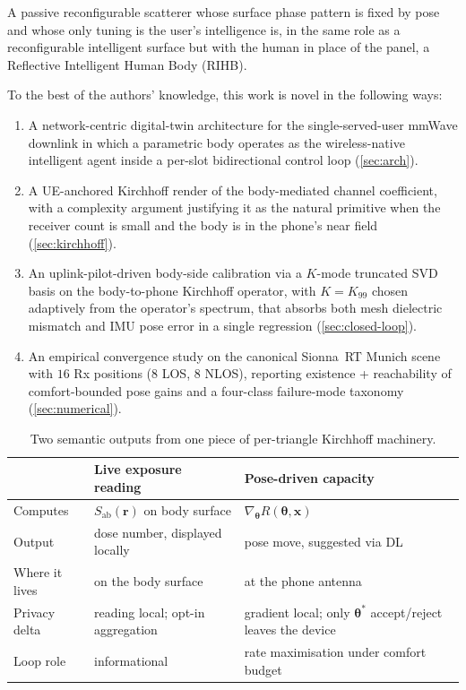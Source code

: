 \documentclass[journal,twocolumn,10pt]{IEEEtran}
\theoremstyle{plain}
\theoremstyle{definition}
\theoremstyle{remark}
\newcommand{\rr}{\mathbf{r}}
\newcommand{\xx}{\mathbf{x}}
\newcommand{\Sab}{S_{\mathrm{ab}}}
\newcommand{\thetab}{\bm{\theta}}
\begin{document}
A passive reconfigurable scatterer whose surface phase pattern is
fixed by pose and whose only tuning is the user's intelligence is,
in the same role as a reconfigurable intelligent surface but with
the human in place of the panel, a Reflective Intelligent Human
Body (RIHB).

To the best of the authors' knowledge, this work is novel in the
following ways:
\begin{enumerate}
\item A network-centric digital-twin architecture for the
single-served-user mmWave downlink in which a parametric body
operates as the wireless-native intelligent agent inside a
per-slot bidirectional control loop (\cref{sec:arch}).
\item A UE-anchored Kirchhoff render of the body-mediated channel
coefficient, with a complexity argument justifying it as the
natural primitive when the receiver count is small and the body is
in the phone's near field (\cref{sec:kirchhoff}).
\item An uplink-pilot-driven body-side calibration via a $K$-mode
truncated SVD basis on the body-to-phone Kirchhoff operator, with
$K = K_{99}$ chosen adaptively from the operator's spectrum, that
absorbs both mesh dielectric mismatch and IMU pose error in a
single regression (\cref{sec:closed-loop}).
\item An empirical convergence study on the canonical Sionna~RT
Munich scene with $16$ Rx positions ($8$ LOS, $8$ NLOS), reporting
existence + reachability of comfort-bounded pose gains and a
four-class failure-mode taxonomy (\cref{sec:numerical}).
\end{enumerate}

\begin{table}[!t]
\caption{Two semantic outputs from one piece of per-triangle
Kirchhoff machinery.}
\label{tab:two-products}
\centering\small
\begin{tabular}{@{}p{}p{}p{}@{}}
\toprule
& \textbf{Live exposure reading} & \textbf{Pose-driven capacity} \\
\midrule
Computes & $\Sab(\rr)$ on body surface & $\nabla_{\thetab} R(\thetab,\xx)$ \\
Output & dose number, displayed locally & pose move, suggested via DL \\
Where it lives & on the body surface & at the phone antenna \\
Privacy delta & reading local; opt-in aggregation & gradient local; only $\thetab^{*}$ accept/reject leaves the device \\
Loop role & informational & rate maximisation under comfort budget \\
\bottomrule
\end{tabular}
\end{table}
\end{document}
